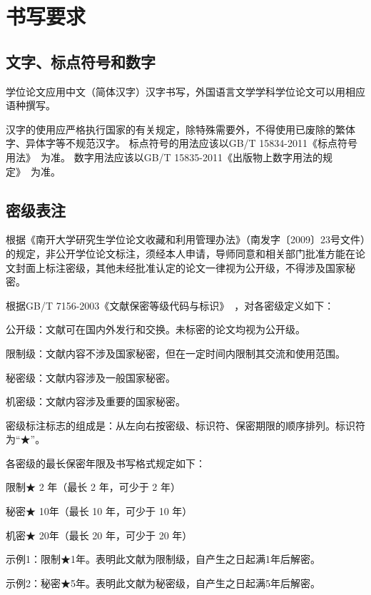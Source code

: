 \chapter{书写要求}
\label{chap:writing-requirements}

\section{文字、标点符号和数字}

学位论文应用中文（简体汉字）汉字书写，外国语言文学学科学位论文可以用相应语种撰写。

汉字的使用应严格执行国家的有关规定，除特殊需要外，不得使用已废除的繁体字、异体字等不规范汉字。
标点符号的用法应该以GB/T 15834-2011《标点符号用法》~\cite{SCSF00038090}为准。
数字用法应该以GB/T 15835-2011《出版物上数字用法的规定》~\cite{SCSF00036561}为准。

\section{密级表注}
\label{sec:writing-classification}

根据《南开大学研究生学位论文收藏和利用管理办法》（南发字〔2009〕23号文件）的规定，非公开学位论文标注，须经本人申请，导师同意和相关部门批准方能在论文封面上标注密级，其他未经批准认定的论文一律视为公开级，不得涉及国家秘密。

根据GB/T 7156-2003《文献保密等级代码与标识》~\cite{SCSF00000734}，对各密级定义如下：

公开级：文献可在国内外发行和交换。未标密的论文均视为公开级。

限制级：文献内容不涉及国家秘密，但在一定时间内限制其交流和使用范围。

秘密级：文献内容涉及一般国家秘密。

机密级：文献内容涉及重要的国家秘密。

密级标注标志的组成是：从左向右按密级、标识符、保密期限的顺序排列。标识符为“{\segoeui{}★}”。

各密级的最长保密年限及书写格式规定如下：

限制{\segoeui{}★} 2 年（最长 2 年，可少于 2 年）

秘密{\segoeui{}★} 10年（最长 10 年，可少于 10 年）

机密{\segoeui{}★} 20年（最长 20 年，可少于 20 年）

示例1：限制{\segoeui{}★}1年。表明此文献为限制级，自产生之日起满1年后解密。

示例2：秘密{\segoeui{}★}5年。表明此文献为秘密级，自产生之日起满5年后解密。

